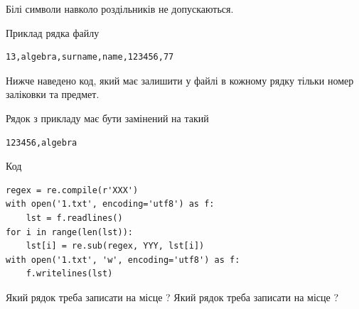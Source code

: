\documentclass[12pt, ukrainian]{article}
\begin{document}
{Білі символи навколо роздільників не допускаються.

Приклад рядка файлу



\begin{verbatim}
13,algebra,surname,name,123456,77
\end{verbatim}


Нижче наведено код, який має залишити у файлі в кожному рядку тільки номер заліковки та предмет.

Рядок з прикладу має бути замінений на такий



\begin{verbatim}
123456,algebra
\end{verbatim}




Код



\begin{verbatim}
regex = re.compile(r'XXX')
with open('1.txt', encoding='utf8') as f:
    lst = f.readlines()
for i in range(len(lst)):
    lst[i] = re.sub(regex, YYY, lst[i])
with open('1.txt', 'w', encoding='utf8') as f:
    f.writelines(lst)
\end{verbatim}







Який рядок треба записати на місце  ?
Який рядок треба записати на місце  ?\par

}
\end{document}
